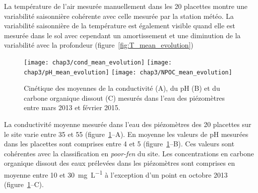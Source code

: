La température de l'air mesurée manuellement dans les 20 placettes montre une variabilité saisonnière cohérente avec celle mesurée par la station météo. 
La variabilité saisonnière de la température est également visible quand elle est mesurée dans le sol avec cependant un amortissement et une diminution de la variabilité avec la profondeur (figure~\ref{fig:T_mean_evolution})

\begin{figure}
\centering
\texttt{[image: chap3/cond\_mean\_evolution]}
\texttt{[image: chap3/pH\_mean\_evolution]}
\texttt{[image: chap3/NPOC\_mean\_evolution]}
\caption{Cinétique des moyennes de la conductivité (A), du pH (B) et du carbone organique dissout (C) mesurés dans l'eau des piézomètres entre mars 2013 et février 2015.}
\label{fig:wtr_phychim}
\end{figure}



%

La conductivité moyenne mesurée dans l'eau des piézomètres des 20 placettes sur le site varie entre \num{35} et \SI{55}{\usml} (figure~\ref{fig:wtr_phychim}--A).
En moyenne les valeurs de pH mesurées dans les placettes sont comprises entre 4 et 5 (figure~\ref{fig:wtr_phychim}--B).
Ces valeurs sont cohérentes avec la classification en \textit{poor-fen} du site.
Les concentrations en carbone organique dissout des eaux prélevées dans les piézomètres sont comprises en moyenne entre \num{10} et \SI{30}{\milli\gram\per\liter} à l'exception d'un point en octobre 2013 (figure~\ref{fig:wtr_phychim}--C).





